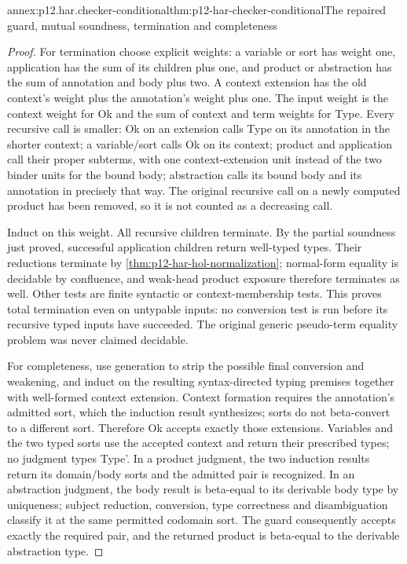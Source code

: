 \begin{annexitem}{annex:p12.har.checker-conditional}{thm:p12-har-checker-conditional}{The repaired guard, mutual soundness, termination and completeness}
\begin{proof}
For termination choose explicit weights: a variable or sort has weight
one, application has the sum of its children plus one, and product or
abstraction has the sum of annotation and body plus two. A context
extension has the old context's weight plus the annotation's weight plus
one. The input weight is the context weight for Ok and the sum of
context and term weights for Type. Every recursive call is smaller:
Ok on an extension calls Type on its annotation in the shorter context;
a variable/sort calls Ok on its context; product and application call
their proper subterms, with one context-extension unit instead of the
two binder units for the bound body; abstraction calls its bound body
and its annotation in precisely that way. The original recursive call
on a newly computed product has been removed, so it is not counted as
a decreasing call.

Induct on this weight. All recursive children terminate. By the partial
soundness just proved, successful application children return well-typed
types. Their reductions terminate by \cref{thm:p12-har-hol-normalization};
normal-form equality is decidable by confluence, and weak-head product
exposure therefore terminates as well. Other tests are finite syntactic
or context-membership tests. This proves total termination even on
untypable inputs: no conversion test is run before its recursive typed
inputs have succeeded. The original generic pseudo-term equality problem
was never claimed decidable.

For completeness, use generation to strip the possible final conversion
and weakening, and induct on the resulting syntax-directed typing
premises together with well-formed context extension. Context formation
requires the annotation's admitted sort, which the induction result
synthesizes; sorts do not beta-convert to a different sort. Therefore Ok
accepts exactly those extensions. Variables and the two typed sorts use
the accepted context and return their prescribed types; no judgment
types Type'. In a product judgment, the two induction results return
its domain/body sorts and the admitted pair is recognized. In an
abstraction judgment, the body result is beta-equal to its derivable
body type by uniqueness; subject reduction, conversion, type correctness
and disambiguation classify it at the same permitted codomain sort.
The guard consequently accepts exactly the required pair, and the
returned product is beta-equal to the derivable abstraction type.


\end{proof}
\end{annexitem}
